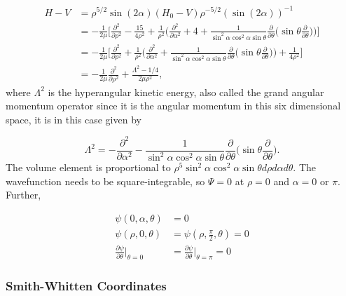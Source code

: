 \documentclass{article}
\numberwithin{equation}{section}
\numberwithin{figure}{section}
\begin{document}
\begin{align}
	H-V &= \rho^{5/2}\sin(2\alpha) (H_0-V) \rho^{-5/2}(\sin(2\alpha))^{-1}\nonumber\\
	    &= -\frac{1}{2\mu} \bigg[ \frac{\partial^2}{\partial\rho^2} - \frac{15}{4\rho^2} + \frac{1}{\rho^2}\bigg( \frac{\partial^2}{\partial\alpha^2} + 4 + \frac{1}{\sin^2\alpha\cos^2\alpha\sin\theta} \frac{\partial}{\partial\theta} \bigg( \sin\theta \frac{\partial}{\partial\theta} \bigg) \bigg) \bigg]\nonumber\\
	    &= -\frac{1}{2\mu} \bigg[ \frac{\partial^2}{\partial\rho^2} + \frac{1}{\rho^2}\bigg( \frac{\partial^2}{\partial\alpha^2} + \frac{1}{\sin^2\alpha\cos^2\alpha\sin\theta} \frac{\partial}{\partial\theta} \bigg( \sin\theta \frac{\partial}{\partial\theta} \bigg) \bigg) + \frac{1}{4\rho^2} \bigg]\nonumber\\
	    &= -\frac{1}{2\mu}\frac{\partial^2}{\partial\rho^2} + \frac{\Lambda^2 - 1/4}{2\mu\rho^2},
\end{align}   
where $\Lambda^2$ is the hyperangular kinetic energy, also called the grand angular momentum operator since it is the angular momentum in this six dimensional space, it is in this case given by 

\begin{equation}
\Lambda^2 = -\frac{\partial^2}{\partial\alpha^2} - \frac{1}{\sin^2\alpha\cos^2\alpha\sin\theta} \frac{\partial}{\partial\theta} \bigg( \sin\theta \frac{\partial}{\partial\theta}\bigg).
\end{equation}
The volume element is proportional to $\rho^5\sin^2\alpha\cos^2\alpha\sin\theta d\rho d\alpha d\theta$. 
The wavefunction needs to be square-integrable, so $\Psi = 0$ at $\rho=0$ and $\alpha = 0 $ or $\pi$. Further, 

\begin{subequations}
\begin{align*}
	\psi(0,\alpha,\theta) &= 0\\
	\psi(\rho,0,\theta)    &= \psi(\rho,\frac{\pi}{2},\theta) = 0\\
	\frac{\partial\psi}{\partial\theta}\bigg\rvert_{\theta = 0} &= \frac{\partial\psi}{\partial\theta}\bigg\rvert_{\theta = \pi} = 0
\end{align*}   
\end{subequations} 

\subsubsection{Smith-Whitten Coordinates}\label{smith}
\end{document}
